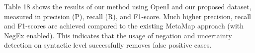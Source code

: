 \documentclass[10pt,twocolumn,letterpaper]{article}
\begin{document}
Table {\color{red} 18} %
shows the results of our method using OpenI and our proposed dataset, measured in precision (P), recall (R), and F1-score. Much higher precision, recall and F1-scores are achieved compared to the existing MetaMap approach (with NegEx enabled). This indicates that the usage of negation and uncertainty detection on syntactic level successfully removes false positive cases. 
\end{document}
